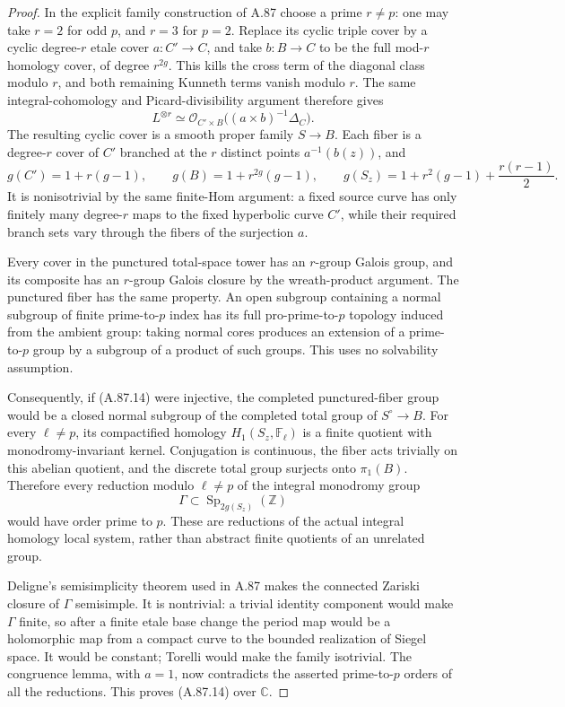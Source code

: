 \documentclass[11pt]{article}
\begin{document}
\begin{proof}
In the explicit family construction of A.87 choose a prime
\(r\ne p\): one may take \(r=2\) for odd \(p\), and
\(r=3\) for \(p=2\). Replace its cyclic triple cover by a
cyclic degree-\(r\) etale cover \(a:C'\to C\), and take
\(b:B\to C\) to be the full mod-\(r\) homology cover,
of degree \(r^{2g}\). This kills the cross term of the
diagonal class modulo \(r\), and both remaining Kunneth
terms vanish modulo \(r\). The same integral-cohomology and
Picard-divisibility argument therefore gives
\[
       L^{\otimes r}\simeq
       \mathcal O_{C'\times B}\bigl((a\times b)^{-1}\Delta_C\bigr).
\]
The resulting cyclic cover is a smooth proper family
\(S\to B\). Each fiber is a degree-\(r\) cover of \(C'\)
branched at the \(r\) distinct points \(a^{-1}(b(z))\), and
\[
   g(C')=1+r(g-1),\qquad g(B)=1+r^{2g}(g-1),\qquad
   g(S_z)=1+r^2(g-1)+\frac{r(r-1)}2.
\]
It is nonisotrivial by the same finite-Hom argument: a fixed
source curve has only finitely many degree-\(r\) maps to the
fixed hyperbolic curve \(C'\), while their required branch
sets vary through the fibers of the surjection \(a\).

Every cover in the punctured total-space tower has an
\(r\)-group Galois group, and its composite has an
\(r\)-group Galois closure by the wreath-product argument.
The punctured fiber has the same property. An open subgroup
containing a normal subgroup of finite prime-to-\(p\) index
has its full pro-prime-to-\(p\) topology induced from the
ambient group: taking normal cores produces an extension
of a prime-to-\(p\) group by a subgroup of a product of such
groups. This uses no solvability assumption.

Consequently, if (A.87.14) were injective, the completed
punctured-fiber group would be a closed normal subgroup of
the completed total group of \(S^\circ\to B\). For every
\(\ell\ne p\), its compactified homology
\(H_1(S_z,\mathbb F_\ell)\) is a finite quotient with
monodromy-invariant kernel. Conjugation is continuous, the
fiber acts trivially on this abelian quotient, and the
discrete total group surjects onto \(\pi_1(B)\). Therefore
every reduction modulo \(\ell\ne p\) of the integral
monodromy group
\[
       \Gamma\subset\operatorname{Sp}_{2g(S_z)}(\mathbb Z)
\]
would have order prime to \(p\). These are reductions of
the actual integral homology local system, rather than
abstract finite quotients of an unrelated group.

Deligne's semisimplicity theorem used in A.87 makes the
connected Zariski closure of \(\Gamma\) semisimple. It is
nontrivial: a trivial identity component would make
\(\Gamma\) finite, so after a finite etale base change the
period map would be a holomorphic map from a compact curve
to the bounded realization of Siegel space. It would be
constant; Torelli would make the family isotrivial. The
congruence lemma, with \(a=1\), now contradicts the asserted
prime-to-\(p\) orders of all the reductions. This proves
(A.87.14) over \(\mathbb C\).


\end{proof}
\end{document}
